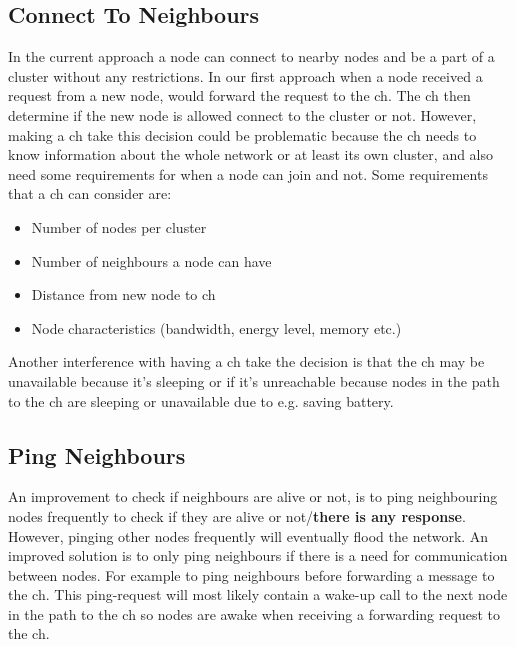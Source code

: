 \documentclass[USenglish]{uit-thesis}
\begin{document}
\subsection{Connect To Neighbours} \label{disc:conn_neighbours}


In the current approach a node can connect to nearby nodes and be a part of a cluster without any restrictions. In our first approach when a node received a request from a new node, would forward the request to the \gls{ch}. The \gls{ch} then determine if the new node is allowed connect to the cluster or not. However, making a \gls{ch} take this decision could be problematic because the \gls{ch} needs to know information about the whole network or at least its own cluster, and also need some requirements for when a node can join and not. Some requirements that a \gls{ch} can consider are:

\begin{itemize}
\item Number of nodes per cluster
\item Number of neighbours a node can have
\item Distance from new node to \gls{ch}
\item Node characteristics (bandwidth, energy level, memory etc.)
\end{itemize}

Another interference with having a \gls{ch} take the decision is that the \gls{ch} may be unavailable because it's sleeping or if it's unreachable because nodes in the path to the \gls{ch} are sleeping or unavailable due to e.g. saving battery. 

\subsection{Ping Neighbours}
An improvement to check if neighbours are alive or not, is to ping neighbouring nodes frequently to check if they are alive or not/\textbf{there is any response}. However, pinging other nodes frequently will eventually flood the network. An improved solution is to only ping neighbours if there is a need for communication between nodes. For example to ping neighbours before forwarding a message to the \gls{ch}. This ping-request will most likely contain a wake-up call to the next node in the path to the \gls{ch} so nodes are awake when receiving a forwarding request to the \gls{ch}.
\end{document}

